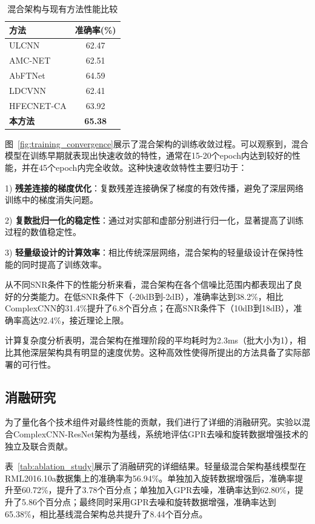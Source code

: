 \documentclass[conference]{IEEEtran}
\begin{document}
\begin{table}[h]
\centering
\caption{混合架构与现有方法性能比较}
\label{tab:hybrid_performance}
\begin{tabular}{@{}lc@{}} %
\toprule
方法 & 准确率(\%) \\
\midrule
ULCNN \cite{b1} & 62.47 \\
AMC-NET \cite{b2} & 62.51 \\
AbFTNet \cite{b3} & 64.59 \\
LDCVNN \cite{b4} & 62.41 \\
HFECNET-CA \cite{b5} & 63.92 \\
\textbf{本方法} & \textbf{65.38} \\
\bottomrule
\end{tabular}
\end{table}

图~\ref{fig:training_convergence}展示了混合架构的训练收敛过程。可以观察到，混合模型在训练早期就表现出快速收敛的特性，通常在15-20个epoch内达到较好的性能，并在45个epoch内完全收敛。这种快速收敛特性主要归功于：

1) \textbf{残差连接的梯度优化}：复数残差连接确保了梯度的有效传播，避免了深层网络训练中的梯度消失问题。

2) \textbf{复数批归一化的稳定性}：通过对实部和虚部分别进行归一化，显著提高了训练过程的数值稳定性。

3) \textbf{轻量级设计的计算效率}：相比传统深层网络，混合架构的轻量级设计在保持性能的同时提高了训练效率。

从不同SNR条件下的性能分析来看，混合架构在各个信噪比范围内都表现出了良好的分类能力。在低SNR条件下（-20dB到-2dB），准确率达到38.2\%，相比ComplexCNN的31.4\%提升了6.8个百分点；在高SNR条件下（10dB到18dB），准确率高达92.4\%，接近理论上限。

计算复杂度分析表明，混合架构在推理阶段的平均耗时为2.3ms（批大小为1），相比其他深层架构具有明显的速度优势。这种高效性使得所提出的方法具备了实际部署的可行性。

\subsection{消融研究}

为了量化各个技术组件对最终性能的贡献，我们进行了详细的消融研究。实验以混合ComplexCNN-ResNet架构为基线，系统地评估GPR去噪和旋转数据增强技术的独立及联合贡献。

表~\ref{tab:ablation_study}展示了消融研究的详细结果。轻量级混合架构基线模型在RML2016.10a数据集上的准确率为56.94\%。单独加入旋转数据增强后，准确率提升至60.72\%，提升了3.78个百分点；单独加入GPR去噪，准确率达到62.80\%，提升了5.86个百分点；最终同时采用GPR去噪和旋转数据增强，准确率达到65.38\%，相比基线混合架构总共提升了8.44个百分点。
\end{document}
